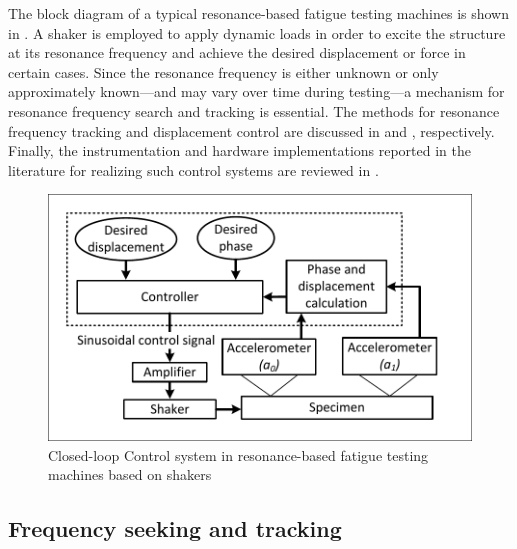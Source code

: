 \documentclass[lettersize,journal]{IEEEtran}
\begin{document}
The block diagram of a typical resonance-based fatigue testing machines is shown in . A shaker is employed to apply dynamic loads in order to excite the structure at its resonance frequency and achieve the desired displacement or force in certain cases. Since the resonance frequency is either unknown or only approximately known—and may vary over time during testing—a mechanism for resonance frequency search and tracking is essential. The methods for resonance frequency tracking and displacement control are discussed in  and , respectively. Finally, the instrumentation and hardware implementations reported in the literature for realizing such control systems are reviewed in .
\begin{figure}
    \centering    \includegraphics[width=\linewidth]{Control_system_fatigue_total.pdf}
    \caption{Closed-loop Control system in resonance-based fatigue testing machines based on shakers}
    \label{F_control_diagram}
\end{figure}



\subsection{Frequency seeking and tracking}  \label{S_frequency_seeking}
\end{document}
